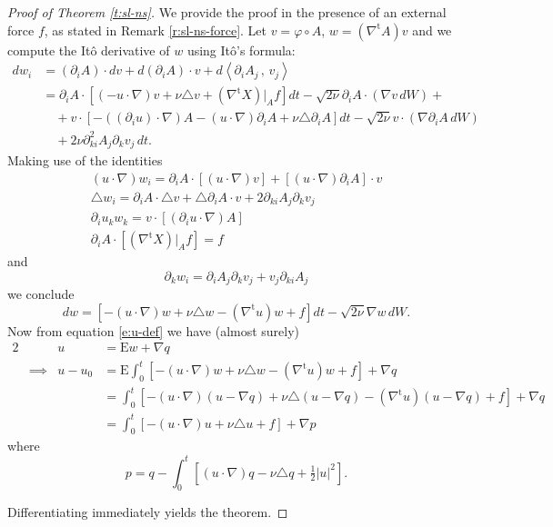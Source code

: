 \documentclass[final]{amsart}%
\newcommand{\del}{\partial}
\newcommand{\lap}{\triangle}
\newcommand{\transpose}{^\text{t}}
\newcommand{\grad}{\nabla}
\newcommand{\gradt}{\grad\transpose}
\newcommand{\E}{\boldsymbol{\mathrm{E}}}
\newcommand{\at}[1]{\big|_{#1}}
\newif\iftextstyle
\newcommand{\qv}[2]{\iftextstyle\langle#1,#2\rangle\else\left\langle#1\,,\,#2\right\rangle\fi}
\numberwithin{equation}{section}
\theoremstyle{definition}
\theoremstyle{remark}
\begin{document}

\begin{proof}[Proof of Theorem \ref{t:sl-ns}]%
We provide the proof in the presence of an external force $f$, as stated in Remark \ref{r:sl-ns-force}. Let $v = \varphi \circ A$, $w = (\gradt A) v$ and we compute the It\^o derivative of $w$ using It\^o's formula:
\begin{align*}
dw_i &= (\del_i A) \cdot dv + d( \del_i A) \cdot v + d\qv{\del_i A_j}{v_j}\\
    &= \del_i A \cdot \left[ (-u\cdot \grad) v + \nu \lap v + (\gradt X)\at{A} f\right] dt - \sqrt{2 \nu} \del_i A \cdot ( \grad v \, dW) +\\
    &\quad+ v \cdot \left[ -\left((\del_i u) \cdot \grad\right) A - ( u \cdot \grad) \del_i A + \nu \lap \del_i A\right] dt - \sqrt{2\nu} v \cdot ( \grad \del_i A \,dW)\\
    &\quad+ 2 \nu \del^2_{ki} A_j \del_k v_j \,dt.
\end{align*}
Making use of the identities
\begin{gather*}
(u \cdot \grad) w_i = \del_i A \cdot [ (u \cdot \grad) v] + [(u \cdot \grad) \del_i A] \cdot v\\
\lap w_i = \del_i A \cdot \lap v + \lap \del_i A \cdot v + 2 \del_{ki} A_j \del_k v_j\\
\del_i u_k w_k = v \cdot \left[ \left( \del_i u \cdot \grad\right) A \right]\\
\del_i A \cdot \left[ (\gradt X)\at{A} f\right] = f
\end{gather*}
and
$$\del_k w_i = \del_i A_j \del_k v_j + v_j \del_{ki} A_j$$
we conclude
\begin{equation}
\label{e:dw} dw = \left[ -(u \cdot \grad) w + \nu \lap w - (\gradt u) w + f \right] dt - \sqrt{2\nu} \grad w \,dW.
\end{equation}
Now from equation \eqref{e:u-def} we have (almost surely)
\begin{alignat*}{2}
&&	u &= \E w + \grad q\\
&\implies& u - u_0 &= \E \int_0^t \left[ -(u \cdot \grad) w + \nu \lap w - (\gradt u) w + f\right] + \grad q\\
&&	&= \int_0^t \left[ -(u \cdot \grad) (u - \grad q) + \nu \lap (u - \grad q) - (\gradt u) (u - \grad q) + f\right] + \grad q\\
&&	&= \int_0^t \left[ -(u \cdot \grad)u + \nu \lap u + f \right] + \grad p
\end{alignat*}
where
$$p = q - \int_0^t \left[ (u \cdot \grad) q - \nu \lap q + \tfrac{1}{2} |u|^2 \right].$$

Differentiating immediately yields the theorem.
\end{proof}
\end{document}
